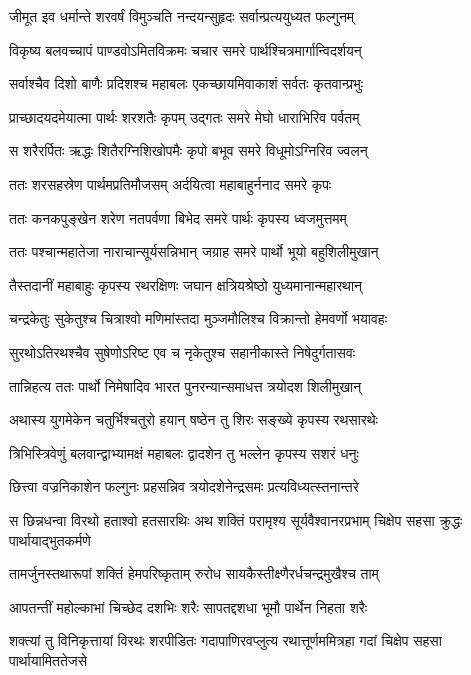 \twolineshloka
{जीमूत इव धर्मान्ते शरवर्षं विमुञ्चति}
{नन्दयन्सुहृदः सर्वान्प्रत्ययुध्यत फल्गुनम्}


\twolineshloka
{विकृष्य बलवच्चापं पाण्डवोऽमितविक्रमः}
{चचार समरे पार्थश्चित्रमार्गान्विदर्शयन्}


\twolineshloka
{सर्वाश्चैव दिशो बाणैः प्रदिशश्च महाबलः}
{एकच्छायमिवाकाशं सर्वतः कृतवान्प्रभुः}


\twolineshloka
{प्राच्छादयदमेयात्मा पार्थः शरशतैः कृपम्}
{उद्गतः समरे मेघो धाराभिरिव पर्वतम्}


\twolineshloka
{स शरैरर्पितः ऋद्धः शितैरग्निशिखोपमैः}
{कृपो बभूव समरे विधूमोऽग्निरिव ज्वलन्}


\twolineshloka
{ततः शरसहस्रेण पार्थमप्रतिमौजसम्}
{अर्दयित्वा महाबाहुर्ननाद समरे कृपः}


\twolineshloka
{ततः कनकपुङ्खेन शरेण नतपर्वणा}
{बिभेद समरे पार्थः कृपस्य ध्वजमुत्तमम्}


\twolineshloka
{ततः पश्चान्महातेजा नाराचान्सूर्यसन्निभान्}
{जग्राह समरे पार्थो भूयो बहुशिलीमुखान्}


\twolineshloka
{तैस्तदानीं महाबाहुः कृपस्य रथरक्षिणः}
{जघान क्षत्रियश्रेष्ठो युध्यमानान्महारथान्}


\twolineshloka
{चन्द्रकेतुः सुकेतुश्च चित्राश्वो मणिमांस्तदा}
{मुञ्जमौलिश्च विक्रान्तो हेमवर्णो भयावहः}


\twolineshloka
{सुरथोऽतिरथश्चैव सुषेणोऽरिष्ट एव च}
{नृकेतुश्च सहानीकास्ते निषेदुर्गतासवः}


\twolineshloka
{तान्निहत्य ततः पार्थो निमेषादिव भारत}
{पुनरन्यान्समाधत्त त्रयोदश शिलीमुखान्}


\twolineshloka
{अथास्य युगमेकेन चतुर्भिश्चतुरो हयान्}
{षष्ठेन तु शिरः सङ्ख्ये कृपस्य रथसारथेः}


\twolineshloka
{त्रिभिस्त्रिवेणुं बलवान्द्वाभ्यामक्षं महाबलः}
{द्वादशेन तु भल्लेन कृपस्य सशरं धनुः}


\twolineshloka
{छित्त्वा वज्रनिकाशेन फल्गुनः प्रहसन्निव}
{त्रयोदशेनेन्द्रसमः प्रत्यविध्यत्स्तनान्तरे}


\threelineshloka
{स छिन्नधन्वा विरथो हताश्वो हतसारथिः}
{अथ शक्तिं परामृश्य सूर्यवैश्वानरप्रभाम्}
{चिक्षेप सहसा क्रुद्धः पार्थायाद्भुतकर्मणे}


\twolineshloka
{तामर्जुनस्तथारूपां शक्तिं हेमपरिष्कृताम्}
{रुरोध सायकैस्तीक्ष्णैरर्धचन्द्रमुखैश्च ताम्}


\twolineshloka
{आपतन्तीं महोल्काभां चिच्छेद दशभिः शरैः}
{सापतद्दशधा भूमौ पार्थेन निहता शरैः}


\threelineshloka
{शक्त्यां तु विनिकृत्तायां विरथः शरपीडितः}
{गदापाणिरवप्लुत्य रथात्तूर्णममित्रहा}
{गदां चिक्षेप सहसा पार्थायामिततेजसे}


